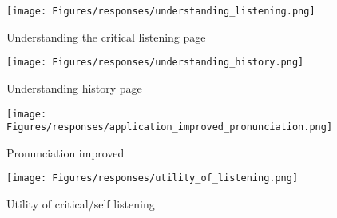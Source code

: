\begin{figure}
	\centering
	\begin{minipage}{.5\textwidth}
		\centering
		\texttt{[image: Figures/responses/understanding\_listening.png]}
		\caption{Understanding the critical listening page}
		\label{fig:understanding_listening}
	\end{minipage}%
	\begin{minipage}{.5\textwidth}
		\centering
		\texttt{[image: Figures/responses/understanding\_history.png]}
		\caption{Understanding history page}
		\label{fig:understanding_history}
	\end{minipage}
\end{figure}

\begin{figure}
	\centering
	\begin{minipage}{.5\textwidth}
		\centering
		\texttt{[image: Figures/responses/application\_improved\_pronunciation.png]}
		\caption{Pronunciation improved}
		\label{fig:application_improved_pronunciation}
	\end{minipage}%
	\begin{minipage}{.5\textwidth}
		\centering
		\texttt{[image: Figures/responses/utility\_of\_listening.png]}
		\caption{Utility of critical/self listening}
		\label{fig:utility_listening}
	\end{minipage}
\end{figure}

